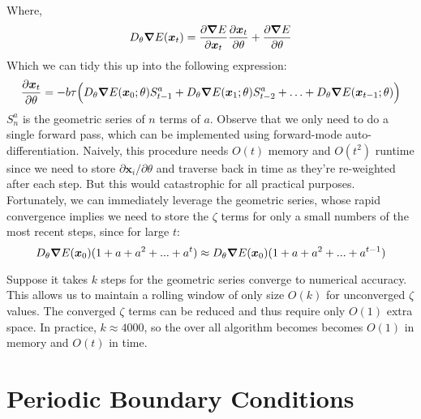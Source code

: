 \documentclass{article}
\begin{document}
Where,
\begin{equation}
D_{\theta} \grad E(\bm{x}_t) = \dfrac{\partial \grad E}{\partial \bm{x}_t} \dfrac{\partial \bm{x}_t} {\partial\theta} + \dfrac{\partial \grad E}{\partial \theta}
\end{equation}
Which we can tidy this up into the following expression:
\begin{equation}
\dfrac {\partial \bm{x}_t}{\partial \theta} = -b  \tau \Big( D_{\theta} \grad E(\bm{x}_0; \theta)S_{t-1}^a + D_{\theta} \grad E(\bm{x}_1;\theta)S_{t-2}^a + \ldots +  D_{\theta} \grad E(\bm{x}_{t-1};\theta) \Big)
\end{equation}
$S_n^a$ is the geometric series of $n$ terms of $a$. Observe that we only need to do a single forward pass, which can be implemented using forward-mode auto-differentiation. Naively, this procedure needs $O(t)$ memory and $O(t^2)$ runtime since we need to store $\partial\bm{x}_i / \partial\theta$ and traverse back in time as they're re-weighted after each step. But this would catastrophic for all practical purposes. Fortunately, we can immediately leverage the geometric series, whose rapid convergence implies we need to store the $\zeta$ terms for only a small numbers of the most recent steps, since for large $t$:
\begin{equation}
D_{\theta} \grad E(\bm{x}_0)(1+a+a^2+...+a^t) \approx D_{\theta} \grad E(\bm{x}_0)(1+a+a^2+...+a^{t-1})
\end{equation}

Suppose it takes $k$ steps for the geometric series converge to numerical accuracy. This allows us to maintain a rolling window of only size $O(k)$ for unconverged $\zeta$ values. The converged $\zeta$ terms can be reduced and thus require only $O(1)$ extra space. In practice, $k \approx 4000$, so the over all algorithm becomes becomes $O(1)$ in memory and $O(t)$ in time.


\section{Periodic Boundary Conditions}
\end{document}

